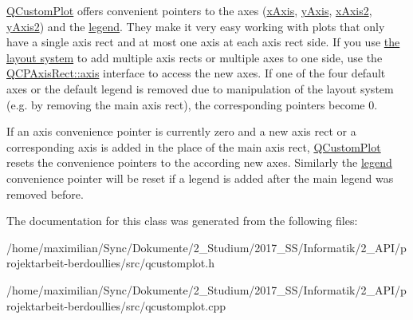 \hyperlink{class_q_custom_plot}{Q\+Custom\+Plot} offers convenient pointers to the axes (\hyperlink{class_q_custom_plot_a9a79cd0158a4c7f30cbc702f0fd800e4}{x\+Axis}, \hyperlink{class_q_custom_plot_af6fea5679725b152c14facd920b19367}{y\+Axis}, \hyperlink{class_q_custom_plot_ada41599f22cad901c030f3dcbdd82fd9}{x\+Axis2}, \hyperlink{class_q_custom_plot_af13fdc5bce7d0fabd640f13ba805c0b7}{y\+Axis2}) and the \hyperlink{class_q_custom_plot_a4eadcd237dc6a09938b68b16877fa6af}{legend}. They make it very easy working with plots that only have a single axis rect and at most one axis at each axis rect side. If you use \hyperlink{}{the layout system} to add multiple axis rects or multiple axes to one side, use the \hyperlink{class_q_c_p_axis_rect_a583ae4f6d78b601b732183f6cabecbe1}{Q\+C\+P\+Axis\+Rect\+::axis} interface to access the new axes. If one of the four default axes or the default legend is removed due to manipulation of the layout system (e.\+g. by removing the main axis rect), the corresponding pointers become 0.

If an axis convenience pointer is currently zero and a new axis rect or a corresponding axis is added in the place of the main axis rect, \hyperlink{class_q_custom_plot}{Q\+Custom\+Plot} resets the convenience pointers to the according new axes. Similarly the \hyperlink{class_q_custom_plot_a4eadcd237dc6a09938b68b16877fa6af}{legend} convenience pointer will be reset if a legend is added after the main legend was removed before. 

The documentation for this class was generated from the following files\+:\begin{DoxyCompactItemize}
\item 
/home/maximilian/\+Sync/\+Dokumente/2\+\_\+\+Studium/2017\+\_\+\+S\+S/\+Informatik/2\+\_\+\+A\+P\+I/projektarbeit-\/berdoullies/src/qcustomplot.\+h\item 
/home/maximilian/\+Sync/\+Dokumente/2\+\_\+\+Studium/2017\+\_\+\+S\+S/\+Informatik/2\+\_\+\+A\+P\+I/projektarbeit-\/berdoullies/src/qcustomplot.\+cpp\end{DoxyCompactItemize}
